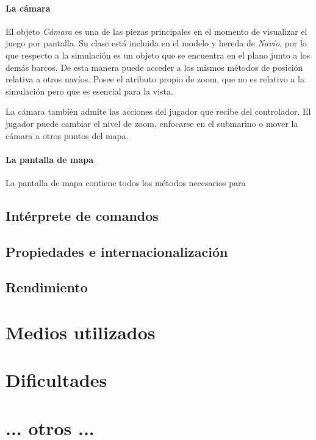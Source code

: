 \documentclass[a4paper,
	11pt,
	parskip=full,
	bibliography=totoc,
	twoside
	]{scrartcl}
\let\oldsection\section
\def\section{\cleardoubleoddpage\oldsection}
\begin{document}
		\paragraph{La cámara}
			El objeto \textit{Cámara} es una de las piezas principales en el momento de visualizar el juego por pantalla. Su clase está incluida en el modelo y hereda de \textit{Navío}, por lo que respecto a la simulación es un objeto que se encuentra en el plano junto a los demás barcos. De esta manera puede acceder a los mismos métodos de posición relativa a otros navíos. Posee el atributo propio de zoom, que no es relativo a la simulación pero que es esencial para la vista.
			
			La cámara también admite las acciones del jugador que recibe del controlador. El jugador puede cambiar el nivel de zoom, enfocarse en el submarino o mover la cámara a otros puntos del mapa.
			
		\paragraph{La pantalla de mapa}
			La pantalla de mapa contiene todos los métodos necesarios para 
	
	\subsection{Intérprete de comandos}
	\label{subsec:interprete_comandos}
	
	\subsection{Propiedades e internacionalización}
	\label{subsec:propiedades_internacionalizacion}
	
	\subsection{Rendimiento}
	\label{subsec:rendimiento}
	
\section{Medios utilizados}
\label{sec:medios}

\section{Dificultades}
\label{sec:dificultades}

\section{ ... otros ...}
\end{document}
